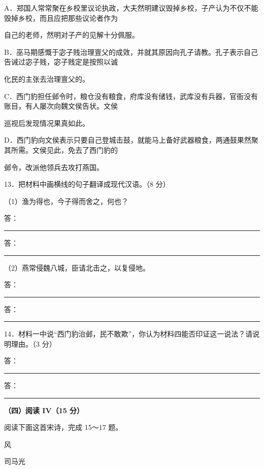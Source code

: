 \documentclass[UTF8,a4paper,fontset=fandol]{ctexart}
\begin{document}
A．郑国人常常聚在乡校里议论执政，大夫然明建议毁掉乡校，子产认为不仅不能毁掉乡校，而且应把那些议论者作为\par
\hspace*{1.8em}自己的老师，然明对子产的见解十分佩服。\par
B．巫马期感慨于宓子贱治理亶父的成效，并就其原因向孔子请教。孔子表示自己告诫过宓子贱，宓子贱定是按照以诚\par
\hspace*{1.8em}化民的主张去治理亶父的。\par
C．西门豹担任邺令时，粮仓没有粮食，府库没有储钱，武库没有兵器，官衙没有账目，有人屡次向魏文侯告状。文侯\par
\hspace*{1.8em}巡视后发现情况果真如此。\par
D．西门豹向文侯表示只要自己登城击鼓，就能马上备好武器粮食，两通鼓果然聚其所需。文侯见此，免去了西门豹的\par
邺令，改派他领兵去攻打燕国。\par
\vspace{0.35em}\par
13．把材料中画横线的句子翻译成现代汉语。（8 分）\par
（1）渔为得也，今子得而舍之，何也？\par
\noindent 答：\rule{0.88\linewidth}{0.35pt}\par
\noindent 答：\rule{0.88\linewidth}{0.35pt}\par
（2）燕常侵魏八城，臣请北击之，以复侵地。\par
\noindent 答：\rule{0.88\linewidth}{0.35pt}\par
\noindent 答：\rule{0.88\linewidth}{0.35pt}\par
14．材料一中说“西门豹治邺，民不敢欺”，你认为材料四能否印证这一说法？请说明理由。（3 分）\par
\noindent 答：\rule{0.88\linewidth}{0.35pt}\par
\noindent 答：\rule{0.88\linewidth}{0.35pt}\par
\vspace{0.35em}\par
\vspace{0.25em}\textbf{（四）阅读 IV（15 分）}\par
阅读下面这首宋诗，完成 15～17 题。\par
\vspace{0.35em}\par
\hspace*{1.8em}风\par
\hspace*{1.8em}司马光\par
\end{document}

